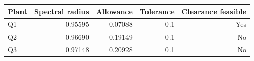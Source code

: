 \begin{tabular}{lrrrr}\toprule
Plant & Spectral radius & Allowance & Tolerance & Clearance feasible \\\midrule
Q1 & 0.95595 & 0.07088 & 0.1 & Yes \\
Q2 & 0.96690 & 0.19149 & 0.1 & No \\
Q3 & 0.97148 & 0.20928 & 0.1 & No \\
\bottomrule\end{tabular}
